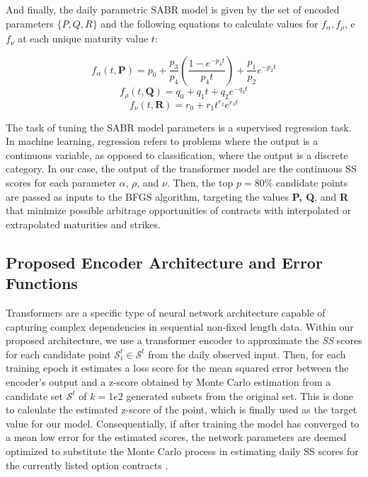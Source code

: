 And finally, the daily parametric SABR model is given by the set of encoded parameters $\{P, Q, R\}$ and the following equations to calculate values for $f_{\alpha}, f_{\rho}$, e $f_{\nu}$ at each unique maturity value $t$:

\begin{equation}
	f_{\alpha}(t, \textbf{P}) = p_0 + \frac{p_3}{p_4} \left( \frac{1 - e^{-p_4 t}}{p_4 t} \right) + \frac{p_1}{p_2} e^{-p_2 t}
\end{equation}
\begin{equation}
	f_{\rho}(t, \textbf{Q}) = q_0 + q_1 t + q_2 e^{-q_3 t}
\end{equation}
\begin{equation}
	f_{\nu}(t, \textbf{R}) = r_0 + r_1 t^{r_2} e^{r_3 t}
\end{equation}

The task of tuning the SABR model parameters is a supervised regression task. In machine learning, regression refers to problems where the output is a continuous variable, as opposed to classification, where the output is a discrete category. In our case, the output of the transformer model are the continuous SS scores for each parameter \(\alpha\), \(\rho\), and \(\nu\). Then, the top $p=80\%$ candidate points are passed as inputs to the BFGS algorithm, targeting the values \textbf{P, Q}, and \textbf{R} that minimize possible arbitrage opportunities of contracts with interpolated or extrapolated maturities and strikes.

\subsection{Proposed Encoder Architecture and Error Functions}

Transformers are a specific type of neural network architecture capable of capturing complex dependencies in sequential non-fixed length data. Within our proposed architecture, we use a transformer encoder to approximate the \textit{SS} scores for each candidate point $\mathcal{S}_{i}^{t} \in \mathcal{S}^{t}$ from the daily observed input. Then, for each training epoch it estimates a loss score for the mean squared error between the encoder's output and a z-score obtained by Monte Carlo estimation from a candidate set $\mathcal{S}^{t}$ of $k=1e2$ generated subsets from the original set. This is done to calculate the estimated z-score of the point, which is finally used as the target value for our model. Consequentially, if after training the model has converged to a mean low error for the estimated scores, the network parameters are deemed optimized to substitute the Monte Carlo process in estimating daily SS scores for the currently listed option contracts \citep{Kim2021}.

